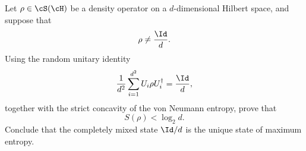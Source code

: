 Let $\rho\in \cS(\cH)$ be a density operator on a $d$-dimensional Hilbert space, and suppose that
$$
\rho\neq \frac{\Id}{d}.
$$
Using the random unitary identity
$$
\frac{1}{d^2}\sum_{i=1}^{d^2} U_i \rho U_i^\dagger
=
\frac{\Id}{d},
$$
together with the strict concavity of the von Neumann entropy, prove that
$$
S(\rho)<\log_2 d.
$$
Conclude that the completely mixed state $\Id/d$ is the unique state of maximum entropy.
